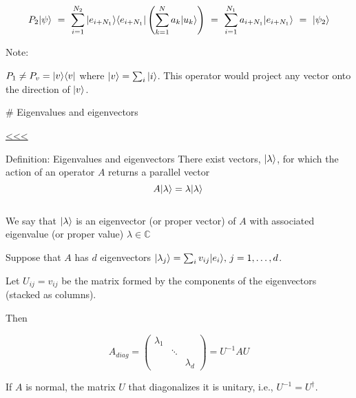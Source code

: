 \documentclass[11pt]{article}
\begin{document}
\[
P_2 |\psi\rangle ~=~ \sum_{i=1}^{N_2} |e_{i+N_1}\rangle\langle e_{i+N_1}| \left(\sum_{k=1}^N a_k |u_k\rangle \right) ~=~
\sum_{i=1}^{N_1} a_{i+N_1} |e_{i+N_1}\rangle ~=~ |\psi_2\rangle
\]

    Note:

\(P_1 \neq P_v = | v\rangle \langle v|\) where \(|v\rangle = \sum_i |i\rangle\).
This operator would project any vector onto the direction of
\(|v\rangle\).

    \# Eigenvalues and eigenvectors

\hyperref[top]{<<<}

    Definition: Eigenvalues and eigenvectors There exist vectors,
\(|\lambda\rangle\), for which the action of an operator \(A\) returns a
parallel vector \[
A|\lambda\rangle = \lambda |\lambda\rangle\, 
\] \\
We say that \(|\lambda\rangle\) is an eigenvector (or proper vector) of
\(A\) with associated eigenvalue (or proper value)
\(\lambda \in {\mathbb C}\)

    Suppose that \(A\) has \(d\) eigenvectors
\(|\lambda_j\rangle = \sum_i v_{ij}|e_i\rangle, \, j=1,\ldots,d\).

Let \(U_{ij} = v_{ij}\) be the matrix formed by the components of the
eigenvectors (stacked as columns).

Then

\[
A_{diag} = \begin{pmatrix} \lambda_1 & & \\ & \ddots & \\ & & \lambda_d \end{pmatrix} = U^{-1} A U
\]

    If \(A\) is normal, the matrix \(U\) that diagonalizes it is unitary,
i.e., \(U^{-1} = U^{\dagger}\).
\end{document}
